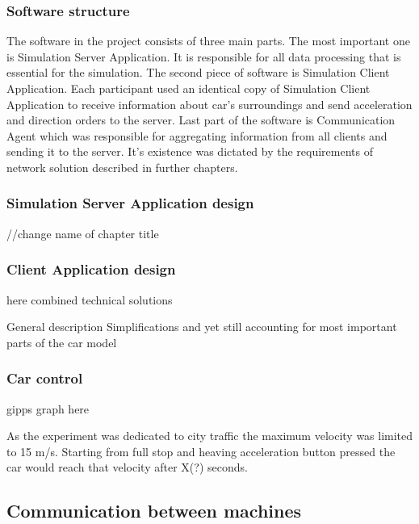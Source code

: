 \documentclass[11pt]{article}
\begin{document}
\subsubsection{Software structure}


The software in the project consists of three  main parts. The most important one is Simulation Server Application. It is responsible for all data processing that is essential for the simulation. The second piece of software is Simulation Client Application. Each participant used an identical copy of Simulation Client Application to receive information about car's surroundings and send acceleration and direction orders to the server. Last part of the software is Communication Agent which was responsible for aggregating information from all clients and sending it to the server. It's existence was dictated by the requirements of network solution described in further chapters.



\subsubsection{Simulation Server Application design}
//change name of chapter title








\subsubsection{Client Application design}

here combined technical solutions 

General description Simplifications and yet still accounting for most important parts of
the car model

\subsubsection{Car control}

gipps graph here


As the experiment was dedicated to city traffic the maximum velocity was limited to 15 m/s. Starting from full stop and heaving acceleration button pressed the car would reach that velocity after X(?) seconds.


\subsection{Communication between machines}
\end{document}
